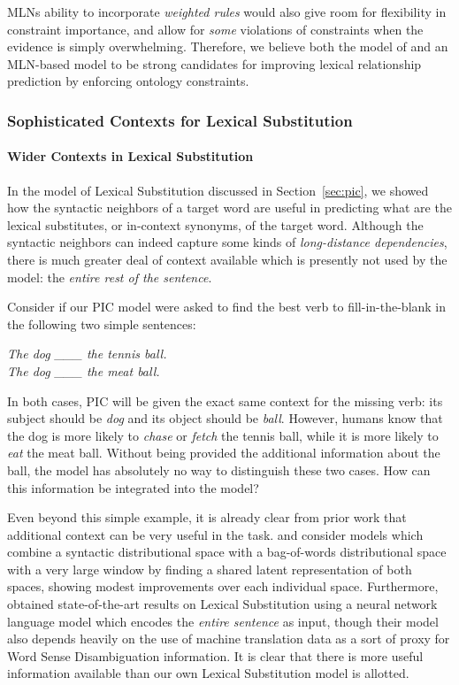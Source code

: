 \documentclass[12pt]{article}
\begin{document}
MLNs ability to incorporate {\em weighted rules} would also give room for
flexibility in constraint importance, and allow for {\em some} violations of
constraints when the evidence is simply overwhelming. Therefore, we believe
both the model of  and an MLN-based model to be strong
candidates for improving lexical relationship prediction by enforcing ontology
constraints.

\subsubsection{Sophisticated Contexts for Lexical Substitution}

\paragraph{Wider Contexts in Lexical Substitution}
In the model of Lexical Substitution discussed in Section~\ref{sec:pic}, we
showed how the syntactic neighbors of a target word are useful in predicting
what are the lexical substitutes, or in-context synonyms, of the target word.
Although the syntactic neighbors can indeed capture some kinds of {\em long-distance
dependencies}, there is much greater deal of context available which is
presently not used by the model: the {\em entire rest of the sentence}.

Consider if our PIC model were asked to find the best verb
to fill-in-the-blank in the following two simple sentences:

\begin{center}
  {\em The dog \_\_\_ the tennis ball.}\\
  {\em The dog \_\_\_ the meat ball.}
\end{center}

In both cases, PIC will be given the exact same context for the missing
verb: its subject should be {\em dog} and its object should be {\em ball}. However,
humans know that the dog is more likely to {\em chase} or {\em fetch} the tennis
ball, while it is more likely to {\em eat} the meat ball. Without being provided
the additional information about the ball, the model has absolutely no way
to distinguish these two cases. How can this information be integrated into the
model?

Even beyond this simple example, it is already clear from prior work that
additional context can be very useful in the task.  and
 consider models which combine
a syntactic distributional space with a bag-of-words distributional space with
a very large window by finding a shared latent representation of both spaces,
showing modest improvements over each individual space. Furthermore,
 obtained state-of-the-art results on Lexical
Substitution using a neural network language model which encodes the {\em
entire sentence} as input, though their model also depends heavily on the use
of machine translation data as a sort of proxy for Word Sense Disambiguation
information. It is clear that there is more useful information
available than our own Lexical Substitution model is allotted.
\end{document}
